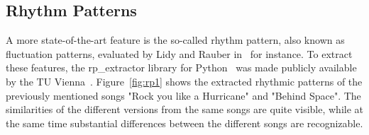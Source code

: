 \subsection{Rhythm Patterns}\label{flucpat}

A more state-of-the-art feature is the so-called rhythm pattern, also known as fluctuation patterns, evaluated by Lidy and Rauber in~\cite{rp1} for instance. 
To extract these features, the rp\_extractor library for Python~\cite{rp_extract} was made publicly available by the TU Vienna~\cite{rp_extract2}. Figure~\ref{fig:rp1} shows the extracted rhythmic patterns of the previously mentioned songs "Rock you like a Hurricane" and "Behind Space". The similarities of the different versions from the same songs are quite visible, while at the same time substantial differences between the different songs are recognizable.

